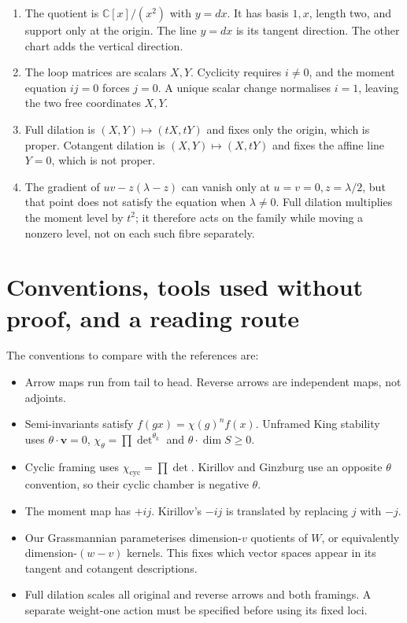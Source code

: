 \documentclass[11pt,a4paper]{article}
\numberwithin{equation}{section}
\theoremstyle{definition}
\newcommand{\vv}{\mathbf v}
\begin{document}
\begin{enumerate}[label=\textbf{\arabic*.},leftmargin=*]
the gauge-dimension term, leaving $2vw=4$.
For isolated $(2,1)$, a map $\mathbb C\to\mathbb C^2$
cannot be surjective, so the cyclic locus is empty.
\item The quotient is $\mathbb C[x]/(x^2)$ with
$y=dx$. It has basis $1,x$, length two, and support
only at the origin. The line $y=dx$ is its tangent
direction. The other chart adds the vertical direction.
\item The loop matrices are scalars $X,Y$. Cyclicity
requires $i\ne0$, and the moment equation $ij=0$
forces $j=0$. A unique scalar change normalises
$i=1$, leaving the two free coordinates $X,Y$.
\item Full dilation is $(X,Y)\mapsto(tX,tY)$ and
fixes only the origin, which is proper. Cotangent
dilation is $(X,Y)\mapsto(X,tY)$ and fixes the
affine line $Y=0$, which is not proper.
\item The gradient of $uv-z(\lambda-z)$ can vanish
only at $u=v=0,z=\lambda/2$, but that point does
not satisfy the equation when $\lambda\ne0$.
Full dilation multiplies the moment level by $t^2$;
it therefore acts on the family while moving a
nonzero level, not on each such fibre separately.
\end{enumerate}

\appendix
\section{Conventions, tools used without proof, and a reading route}
\label{app:tools}

The conventions to compare with the references are:
\begin{itemize}
\item Arrow maps run from tail to head. Reverse arrows
are independent maps, not adjoints.
\item Semi-invariants satisfy $f(gx)=\chi(g)^n f(x)$.
Unframed King stability uses $\theta\cdot\vv=0$,
$\chi_\theta=\prod\det^{\theta_k}$ and
$\theta\cdot\dim S\ge0$.
\item Cyclic framing uses $\chi_{\mathrm{cyc}}=\prod\det$.
Kirillov and Ginzburg use an opposite $\theta$ convention,
so their cyclic chamber is negative $\theta$.
\item The moment map has $+ij$. Kirillov's $-ij$ is
translated by replacing $j$ with $-j$.
\item Our Grassmannian parameterises dimension-$v$
quotients of $W$, or equivalently dimension-$(w-v)$
kernels. This fixes which vector spaces appear in its
tangent and cotangent descriptions.
\item Full dilation scales all original and reverse
arrows and both framings. A separate weight-one
action must be specified before using its fixed loci.
\end{itemize}
\end{document}
